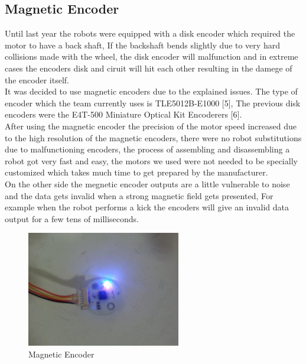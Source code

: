 \subsection{Magnetic Encoder}
Until last year the robots were equipped with a disk encoder which required the motor to have a back shaft, If the backshaft bends slightly due to very hard collisions made with the wheel, the disk encoder will malfunction and in extreme cases the encoders disk and ciruit will hit each other resulting in the damege of the encoder itself.\\
\indent It was decided to use magnetic encoders due to the explained issues. The type of encoder which the team currently uses is TLE5012B-E1000 [5], The previous disk encoders were the E4T-500 Miniature Optical Kit Encoderers [6].\\
\indent After using the magnetic encoder the precision of the motor speed increased due to the high resolution of the magnetic encoders, there were no robot substitutions due to malfunctioning encoders, the process of assembling and disassembling a robot got very fast and easy, the motors we used were not needed to be specially customized which takes much time to get prepared by the manufacturer.\\
\indent On the other side the megnetic encoder outputs are a little vulnerable to noise and the data gets invalid when a strong magnetic field gets presented, For example when the robot performs a kick the encoders will give an invalid data output for a few tens of milliseconds.\\




\begin{figure}
	\centering
	\includegraphics[width=0.6\textwidth]{images/MAG_ENC.jpg}
	\caption{Magnetic Encoder}
	\label{fig:MAG_ENC}
\end{figure}\\


